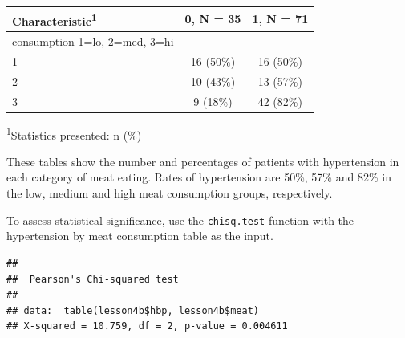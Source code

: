 \documentclass[]{book}
\newenvironment{Shaded}{\begin{snugshade}}{\end{snugshade}}
\newcommand{\DataTypeTok}[1]{\textcolor[rgb]{0.13,0.29,0.53}{#1}}
\newcommand{\KeywordTok}[1]{\textcolor[rgb]{0.13,0.29,0.53}{\textbf{#1}}}
\newcommand{\NormalTok}[1]{#1}
\newcommand{\OperatorTok}[1]{\textcolor[rgb]{0.81,0.36,0.00}{\textbf{#1}}}
\newcommand{\OtherTok}[1]{\textcolor[rgb]{0.56,0.35,0.01}{#1}}
\newcommand{\StringTok}[1]{\textcolor[rgb]{0.31,0.60,0.02}{#1}}
\begin{document}
\begin{Shaded}
\end{Shaded}

\captionsetup[table]{labelformat=empty,skip=1pt}
\begin{longtable}{lcc}
\toprule
\textbf{Characteristic}\textsuperscript{1} & \textbf{0}, N = 35 & \textbf{1}, N = 71 \\ 
\midrule
consumption 1=lo, 2=med, 3=hi &  &  \\ 
1 & 16 (50\%) & 16 (50\%) \\ 
2 & 10 (43\%) & 13 (57\%) \\ 
3 & 9 (18\%) & 42 (82\%) \\ 
\bottomrule
\end{longtable}
\vspace{-5mm}
\begin{minipage}{\linewidth}
\textsuperscript{1}Statistics presented: n (\%) \\ 
\end{minipage}

These tables show the number and percentages of patients with
hypertension in each category of meat eating. Rates of hypertension are
50\%, 57\% and 82\% in the low, medium and high meat consumption groups,
respectively.

To assess statistical significance, use the \texttt{chisq.test} function
with the hypertension by meat consumption table as the input.

\begin{Shaded}
\end{Shaded}

\begin{verbatim}
## 
##  Pearson's Chi-squared test
## 
## data:  table(lesson4b$hbp, lesson4b$meat)
## X-squared = 10.759, df = 2, p-value = 0.004611
\end{verbatim}
\end{document}
